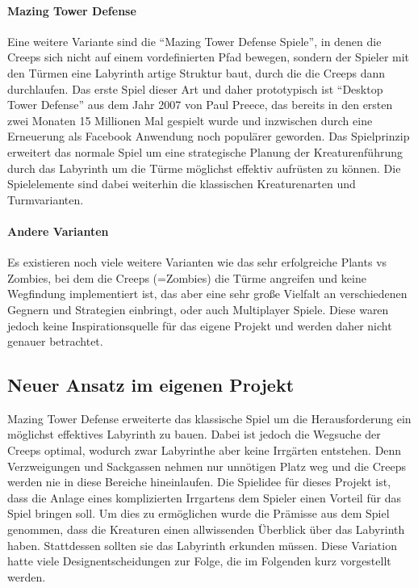 \paragraph{Mazing Tower Defense}
Eine weitere Variante sind die \enquote{Mazing Tower Defense Spiele}, in denen die Creeps sich nicht auf einem vordefinierten Pfad bewegen, sondern der Spieler mit den Türmen eine Labyrinth artige Struktur baut, durch die die Creeps dann durchlaufen. Das erste Spiel dieser Art und daher prototypisch ist \enquote{Desktop Tower Defense} aus dem Jahr 2007 von Paul Preece, das bereits in den ersten zwei Monaten 15 Millionen Mal gespielt wurde und inzwischen durch eine Erneuerung als Facebook Anwendung noch populärer geworden. Das Spielprinzip erweitert das normale Spiel um eine strategische Planung der Kreaturenführung durch das Labyrinth um die Türme möglichst effektiv aufrüsten zu können. Die Spielelemente sind dabei weiterhin die klassischen Kreaturenarten und Turmvarianten.


\paragraph{Andere Varianten} Es existieren noch viele weitere Varianten wie das sehr erfolgreiche Plants vs Zombies, bei dem die Creeps (=Zombies) die Türme angreifen und keine Wegfindung implementiert ist, das aber eine sehr große Vielfalt an verschiedenen Gegnern und Strategien einbringt, oder auch Multiplayer Spiele. Diese waren jedoch keine Inspirationsquelle für das eigene Projekt und werden daher nicht genauer betrachtet.


\subsection{Neuer Ansatz im eigenen Projekt} %
\label{sub:neuer_ansatz_im_eigenen_projekt}

Mazing Tower Defense erweiterte das klassische Spiel um die Herausforderung ein möglichst effektives Labyrinth zu bauen. Dabei ist jedoch die Wegsuche der Creeps optimal, wodurch zwar Labyrinthe aber keine Irrgärten entstehen. Denn Verzweigungen und Sackgassen nehmen nur unnötigen Platz weg und die Creeps werden nie in diese Bereiche hineinlaufen. Die Spielidee für dieses Projekt ist, dass die Anlage eines komplizierten Irrgartens dem Spieler einen Vorteil für das Spiel bringen soll. Um dies zu ermöglichen wurde die Prämisse aus dem Spiel genommen, dass die Kreaturen einen allwissenden Überblick über das Labyrinth haben. Stattdessen sollten sie das Labyrinth erkunden müssen. Diese Variation hatte viele Designentscheidungen zur Folge, die im Folgenden kurz vorgestellt werden.

